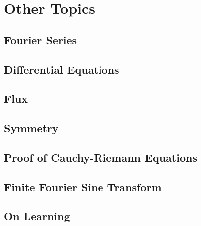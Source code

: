 \documentclass{article}
\begin{document}
\section{Other Topics} 

\subsection{Fourier Series}
\subsection{Differential Equations} 
\subsection{Flux} 
\subsection{Symmetry} 
\subsection{Proof of Cauchy-Riemann Equations} 
\subsection{Finite Fourier Sine Transform} 
\subsection{On Learning} 
\end{document}
